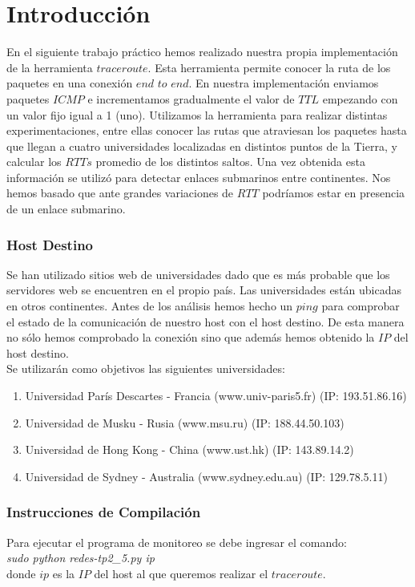 \section{Introducción}

En el siguiente trabajo práctico hemos realizado nuestra propia implementación de la herramienta $traceroute$.
Esta herramienta permite conocer la ruta de los paquetes en una conexión $end$ $to$ $end$. 
En nuestra implementación enviamos paquetes $ICMP$ e incrementamos gradualmente el valor de $TTL$ empezando con un valor fijo igual a 1 (uno). 
Utilizamos la herramienta para realizar distintas experimentaciones, entre ellas conocer las rutas que atraviesan los paquetes hasta que 
llegan a cuatro universidades localizadas en distintos puntos de la Tierra, y calcular los $RTTs$ promedio de los distintos saltos.
Una vez obtenida esta información se utilizó para detectar enlaces submarinos entre continentes. Nos hemos basado que ante grandes variaciones
de $RTT$ podríamos estar en presencia de un enlace submarino.

\subsubsection{Host Destino}
Se han utilizado sitios web de universidades dado que es más probable que los servidores web se encuentren en el propio país.
Las universidades están ubicadas en otros continentes. Antes de los análisis hemos hecho un $ping$ para comprobar 
el estado de la comunicación de nuestro host con el host destino. De esta manera no sólo hemos comprobado la conexión sino que además hemos obtenido 
la $IP$ del host destino.\\

Se utilizarán como objetivos las siguientes universidades:
\begin{enumerate}
\item Universidad París Descartes - Francia (www.univ-paris5.fr) (IP: 193.51.86.16)
\item Universidad de Musku - Rusia (www.msu.ru) (IP: 188.44.50.103)
\item Universidad de Hong Kong - China (www.ust.hk) (IP: 143.89.14.2)
\item Universidad de Sydney - Australia (www.sydney.edu.au) (IP: 129.78.5.11)
\end{enumerate}

\subsubsection{Instrucciones de Compilación}
Para ejecutar el programa de monitoreo se debe ingresar el comando:\\ 

\textit{     sudo python redes-tp2\_5.py ip}\\

donde $ip$ es la $IP$ del host al que queremos realizar el $traceroute$.


